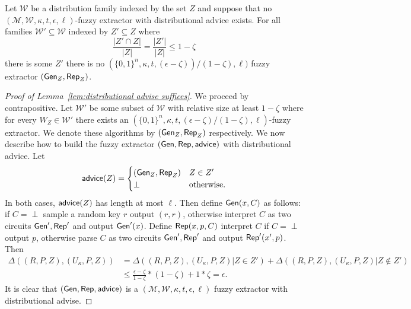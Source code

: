 \begin{lemma}

Let $\mathcal{W}$ be a distribution family indexed by the set $Z$ and suppose that no $(\mathcal{M}, \mathcal{W}, \kappa, t, \epsilon, \ell)$-fuzzy extractor with distributional advice exists.  For all families $\mathcal{W}'\subseteq \mathcal{W}$ indexed by $Z'\subseteq Z$ where \[\frac{|Z'\cap Z|}{|Z|} = \frac{|Z'|}{|Z|}\le 1-\zeta\] there is some $Z'$ there is no  $(\{0,1\}^n,\kappa, t, (\epsilon-\zeta))/(1-\zeta), \ell)$ fuzzy extractor $({\mathsf{Gen}}_Z, {\mathsf{Rep}}_Z)$.
\label{lem:distributional advise suffices}
\end{lemma}
\begin{proof}[Proof of Lemma~\ref{lem:distributional advise suffices}]
We proceed by contrapositive.  Let $\mathcal{W}'$ be some subset of $\mathcal{W}$ with relative size at least $1-\zeta$ where  for every $W_Z\in\mathcal{W}'$ there exists an $(\{0,1\}^n,\kappa, t, (\epsilon-\zeta)/(1-\zeta), \ell)$-fuzzy extractor.  We denote these algorithms by $({\mathsf{Gen}}_Z, {\mathsf{Rep}}_Z)$ respectively.  We now describe how to build the fuzzy extractor $({\mathsf{Gen}}, {\mathsf{Rep}}, {\mathsf{advice}})$ with distributional advice.  Let 
\[
{\mathsf{advice}}(Z) = \begin{cases} ({\mathsf{Gen}}_Z, {\mathsf{Rep}}_Z)& Z\in Z'\\\perp&\text{otherwise.}\end{cases}
\]
In both cases, ${\mathsf{advice}}(Z)$ has length at most $\ell$. Then define ${\mathsf{Gen}}(x, C)$ as follows:  if $C = \perp$ sample a random key $r$ output $(r, r)$, otherwise interpret $C$ as two circuits ${\mathsf{Gen}}', {\mathsf{Rep}}'$ and output ${\mathsf{Gen}}'(x)$.  Define ${\mathsf{Rep}}(x, p, C)$ interpret $C$ if $C = \perp$ output $p$, otherwise parse $C$ as two circuits ${\mathsf{Gen}}', {\mathsf{Rep}}'$ and output ${\mathsf{Rep}}'(x', p)$.  
Then 
\begin{align*}
\Delta((R, P, Z), (U_\kappa, P, Z)) &= \Delta((R, P, Z), (U_\kappa, P, Z) | Z\in Z')+\Delta((R, P, Z), (U_\kappa, P, Z) | Z\not\in Z')\\
&\le \frac{\epsilon-\zeta}{1-\zeta} * (1-\zeta) + 1* \zeta = \epsilon.
\end{align*}
It is clear that $({\mathsf{Gen}}, {\mathsf{Rep}}, {\mathsf{advice}})$ is a $(\mathcal{M}, \mathcal{W}, \kappa, t, \epsilon, \ell)$ fuzzy extractor with distributional advise.
\end{proof}

